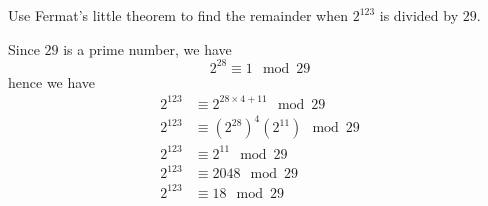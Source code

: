 \documentclass[12pt]{article}
\newenvironment{question}[2][Question]{\begin{trivlist}
    \item[\hskip \labelsep {\bfseries #1}\hskip \labelsep {\bfseries #2.}]}{\end{trivlist}}
\newenvironment{answer}[2][Answer]{\begin{trivlist}
    \item[\hskip \labelsep {\bfseries #1}\hskip \labelsep {\bfseries #2.}]}{\end{trivlist}}
\begin{document}
\begin{question}{Q. 2}
	Use Fermat’s little theorem to find the remainder when $2^{123}$ is divided by $29$. 
\end{question}
\begin{answer}{Q. 2}
	\hfill \break
    Since $29$ is a prime number, we have
    $$ 2^{28} \equiv 1  \mod {29}$$
    hence we have
    \begin{align}
        2^{123} &\equiv 2^{28\times 4 + 11} \mod 29 \\
        2^{123} &\equiv (2^{28})^4  (2^{11}) \mod 29 \\
        2^{123} &\equiv  2^{11} \mod 29 \\
        2^{123} &\equiv  2048 \mod 29 \\
        2^{123} &\equiv  18 \mod 29 
    \end{align}
\end{answer}
\end{document}
